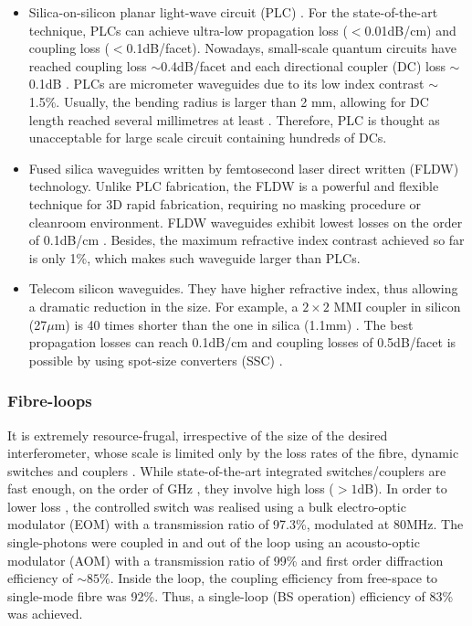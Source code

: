 \documentclass[aps, rmp, twocolumn, amsmath, amssymb, nofootinbib, superscriptaddress, longbibliography, floatfix, table-of-contents, eqsecnum]{revtex4-1}
\begin{document}
\begin{itemize}
    \item Silica-on-silicon planar light-wave circuit (PLC) \cite{hibino2003silica}. For the state-of-the-art technique, PLCs can achieve ultra-low propagation loss ($<$0.01dB/cm) and coupling loss ($<$0.1dB/facet). Nowadays, small-scale quantum circuits have reached coupling loss $\sim$0.4dB/facet and each directional coupler (DC) loss $\sim$0.1dB \cite{carolan2015universal}. PLCs are micrometer waveguides due to its low index contrast $\sim$1.5\%. Usually, the bending radius is larger than 2 mm, allowing for DC length reached several millimetres at least \cite{carolan2015universal}. Therefore, PLC is thought as unacceptable for large scale circuit containing hundreds of DCs.

    \item Fused silica waveguides written by femtosecond laser direct written (FLDW) technology. Unlike PLC fabrication, the FLDW is a powerful and flexible technique for 3D rapid fabrication, requiring no masking procedure or cleanroom environment. FLDW waveguides exhibit lowest losses on the order of 0.1dB/cm \cite{sakuma2003ultra}. Besides, the maximum refractive index contrast achieved so far is only 1\%, which makes such waveguide larger than PLCs.

    \item Telecom silicon waveguides. They have higher refractive index, thus allowing a dramatic reduction in the size. For example, a \mbox{$2\times 2$} MMI coupler in silicon (27$\mu$m) \cite{bonneau2012quantum} is 40 times shorter than the one in silica (1.1mm) \cite{peruzzo2011}. The best propagation losses can reach 0.1dB/cm \cite{lee2000, gnan2008} and coupling losses of 0.5dB/facet is possible by using spot-size converters (SSC) \cite{almeida2003, mcnab2003}.
\end{itemize}

%
%

\subsubsection{Fibre-loops}  

It is extremely resource-frugal, irrespective of the size of the desired interferometer, whose scale is limited only by the loss rates of the fibre, dynamic switches and couplers \cite{motes2014}. While state-of-the-art integrated switches/couplers are fast enough, on the order of GHz \cite{winzer2010, schindler2014}, they involve high loss ($>1$dB). In order to lower loss \cite{he2016}, the controlled switch was realised using a bulk electro-optic modulator (EOM) with a transmission ratio of 97.3\%, modulated at 80MHz. The single-photons were coupled in and out of the loop using an acousto-optic modulator (AOM) with a transmission ratio of 99\% and first order diffraction efficiency of $\sim 85\%$. Inside the loop, the coupling efficiency from free-space to single-mode fibre was 92\%. Thus, a single-loop (BS operation) efficiency of 83\% was achieved.
\end{document}
